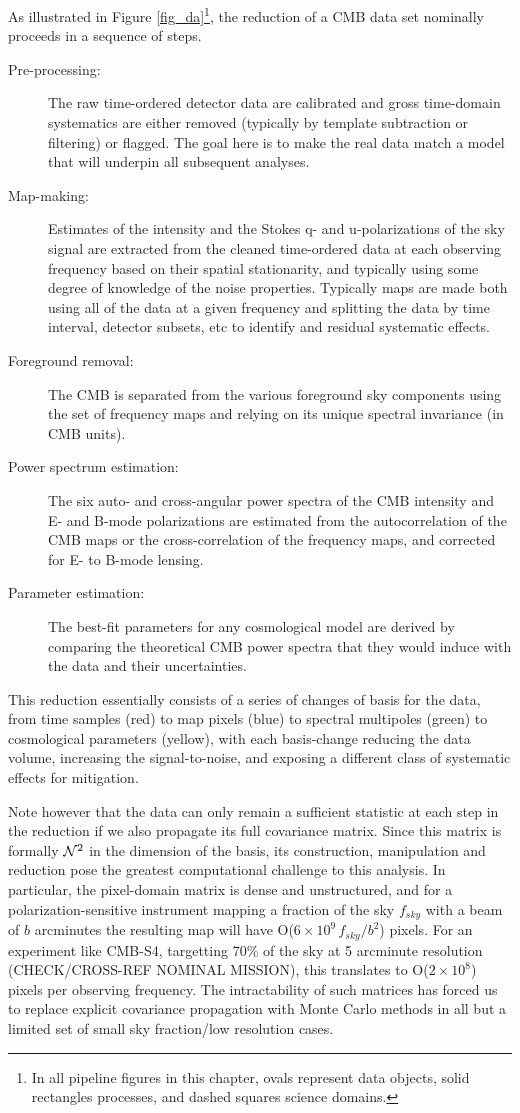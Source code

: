 As illustrated in Figure \ref{fig_da}\footnote{In all pipeline figures in this chapter, ovals represent data objects, solid rectangles processes, and dashed squares science domains.}, the reduction of a CMB data set nominally proceeds in a sequence of steps.
\begin{description}
\item[ Pre-processing:] The raw time-ordered detector data are calibrated and gross time-domain systematics are either removed (typically by template subtraction or filtering) or flagged. The goal here is to make the real data match a model that will underpin all subsequent analyses.
\item[Map-making:] Estimates of the intensity and the Stokes q- and u-polarizations of the sky signal are extracted from the cleaned time-ordered data at each observing frequency based on their spatial stationarity, and typically using some degree of knowledge of the noise properties. Typically maps are made both using all of the data at a given frequency and splitting the data by time interval, detector subsets, etc to identify and residual systematic effects.
\item[Foreground removal:] The CMB is separated from the various foreground sky components using the set of frequency maps and relying on its unique spectral invariance (in CMB units).
\item[Power spectrum estimation:] The six auto- and cross-angular power spectra of the CMB intensity and E- and B-mode polarizations are estimated from the autocorrelation of the CMB maps or the cross-correlation of the frequency maps, and corrected for E- to B-mode lensing.
\item[Parameter estimation:] The best-fit parameters for any cosmological model are derived by comparing the theoretical CMB power spectra that they would induce with the data and their uncertainties.
\end{description}
This reduction essentially consists of a series of changes of basis for the data, from time samples (red) to map pixels (blue) to spectral multipoles (green) to cosmological parameters (yellow), with each basis-change reducing the data volume, increasing the signal-to-noise, and exposing a different class of systematic effects for mitigation. 

Note however that the data can only remain a sufficient statistic at each step in the reduction if we also propagate its full covariance matrix. Since this matrix is formally ${\cal N}^2$ in the dimension of the basis, its construction, manipulation and reduction pose the greatest computational challenge to this analysis. In particular, the pixel-domain matrix is dense and unstructured, and for a polarization-sensitive instrument mapping a fraction of the sky $f_{sky}$ with a beam of $b$ arcminutes the resulting map will have O($6 \times 10^9 \, f_{sky}/b^2$) pixels. For an experiment like CMB-S4, targetting 70\% of the sky at 5 arcminute resolution (CHECK/CROSS-REF NOMINAL MISSION), this translates to O($2 \times 10^8$) pixels per observing frequency. The intractability of such matrices has forced us to replace explicit covariance propagation with Monte Carlo methods in all but a limited set of small sky fraction/low resolution cases.

